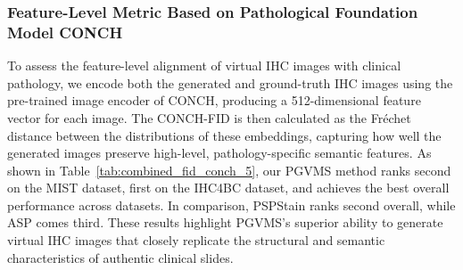 \documentclass[journal,twoside,web]{ieeecolor}
\begin{document}
\subsubsection{Feature-Level Metric Based on Pathological Foundation Model CONCH}
{
To assess the feature-level alignment of virtual IHC images with clinical pathology, we encode both the generated and ground-truth IHC images using the pre-trained image encoder of CONCH, producing a 512-dimensional feature vector for each image. The CONCH-FID is then calculated as the Fréchet distance between the distributions of these embeddings, capturing how well the generated images preserve high-level, pathology-specific semantic features. As shown in Table~\ref{tab:combined_fid_conch_5}, our PGVMS method ranks second on the MIST dataset, first on the IHC4BC dataset, and achieves the best overall performance across datasets. In comparison, PSPStain ranks second overall, while ASP comes third. These results highlight PGVMS’s superior ability to generate virtual IHC images that closely replicate the structural and semantic characteristics of authentic clinical slides.
}
\end{document}
